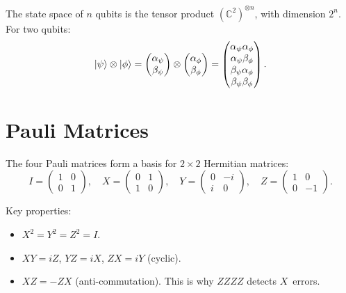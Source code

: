 \documentclass[11pt,a4paper,twoside]{report}
\theoremstyle{definition}
\begin{document}
The state space of $n$ qubits is the tensor product
$(\mathbb{C}^2)^{\otimes n}$, with dimension $2^n$. For two qubits:
\begin{equation}
  \ket{\psi} \otimes \ket{\phi}
  = \begin{pmatrix} \alpha_\psi \\ \beta_\psi \end{pmatrix}
    \otimes
    \begin{pmatrix} \alpha_\phi \\ \beta_\phi \end{pmatrix}
  = \begin{pmatrix}
      \alpha_\psi \alpha_\phi \\
      \alpha_\psi \beta_\phi \\
      \beta_\psi \alpha_\phi \\
      \beta_\psi \beta_\phi
    \end{pmatrix}.
\end{equation}

\section{Pauli Matrices}

The four Pauli matrices form a basis for $2 \times 2$ Hermitian
matrices:
\begin{equation}
  I = \begin{pmatrix} 1&0\\0&1 \end{pmatrix}, \quad
  X = \begin{pmatrix} 0&1\\1&0 \end{pmatrix}, \quad
  Y = \begin{pmatrix} 0&-i\\i&0 \end{pmatrix}, \quad
  Z = \begin{pmatrix} 1&0\\0&-1 \end{pmatrix}.
\end{equation}

Key properties:
\begin{itemize}
  \item $X^2 = Y^2 = Z^2 = I$.
  \item $XY = iZ$, $YZ = iX$, $ZX = iY$ (cyclic).
  \item $XZ = -ZX$ (anti-commutation). This is why $ZZZZ$ detects
        $X$~errors.
\end{itemize}
\end{document}

